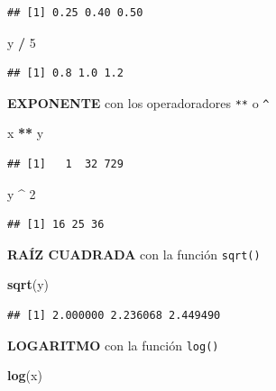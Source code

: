 \documentclass[
]{book}
\newenvironment{Shaded}{\begin{snugshade}}{\end{snugshade}}
\newcommand{\DecValTok}[1]{\textcolor[rgb]{0.00,0.00,0.81}{#1}}
\newcommand{\FunctionTok}[1]{\textcolor[rgb]{0.13,0.29,0.53}{\textbf{#1}}}
\newcommand{\NormalTok}[1]{#1}
\newcommand{\SpecialCharTok}[1]{\textcolor[rgb]{0.81,0.36,0.00}{\textbf{#1}}}
\begin{document}
\begin{verbatim}
## [1] 0.25 0.40 0.50
\end{verbatim}

\begin{Shaded}
\begin{Highlighting}[]
\NormalTok{y }\SpecialCharTok{/} \DecValTok{5}
\end{Highlighting}
\end{Shaded}

\begin{verbatim}
## [1] 0.8 1.0 1.2
\end{verbatim}

\textbf{EXPONENTE} con los operadoradores \texttt{**} o \texttt{\^{}}

\begin{Shaded}
\begin{Highlighting}[]
\NormalTok{x }\SpecialCharTok{**}\NormalTok{ y}
\end{Highlighting}
\end{Shaded}

\begin{verbatim}
## [1]   1  32 729
\end{verbatim}

\begin{Shaded}
\begin{Highlighting}[]
\NormalTok{y }\SpecialCharTok{\^{}} \DecValTok{2}
\end{Highlighting}
\end{Shaded}

\begin{verbatim}
## [1] 16 25 36
\end{verbatim}

\textbf{RAÍZ CUADRADA} con la función \texttt{sqrt()}

\begin{Shaded}
\begin{Highlighting}[]
\FunctionTok{sqrt}\NormalTok{(y)}
\end{Highlighting}
\end{Shaded}

\begin{verbatim}
## [1] 2.000000 2.236068 2.449490
\end{verbatim}

\textbf{LOGARITMO} con la función \texttt{log()}

\begin{Shaded}
\begin{Highlighting}[]
\FunctionTok{log}\NormalTok{(x)}
\end{Highlighting}
\end{Shaded}
\end{document}
